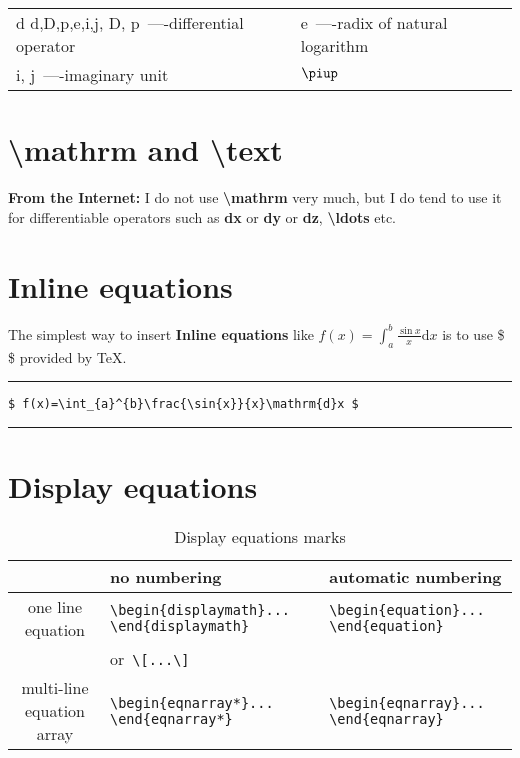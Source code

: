 \vspace{-0.5em}
\begin{flushleft}
\begin{tabularx}{0.7\textwidth}{XX}
$\mathrm{d}$ $\text{d,D,p,e,i,j}$, $\mathrm{D}$, $\mathrm{p}$~----differential operator & $\mathrm{e}$~----radix of natural logarithm\\
$\mathrm{i}$, $\mathrm{j}$~----imaginary unit & $\piup$\\
\end{tabularx}
\end{flushleft}

\section{\textbackslash mathrm and \textbackslash text}
\textbf{From the Internet:} I do not use \textbf{\textbackslash mathrm} very much, but I do tend to use it for differentiable operators such as \textbf{dx} or \textbf{dy} or \textbf{dz}, \textbf{\textbackslash ldots} etc.


\section{Inline equations}
The simplest way to insert \textbf{Inline equations} like $ f(x)=\int_{a}^{b}\frac{\sin{x}}{x}\mathrm{d}x $ is to use \$ \$ provided by \TeX{}.

\noindent\vspace{1em}\hrule
\begin{verbatim}
$ f(x)=\int_{a}^{b}\frac{\sin{x}}{x}\mathrm{d}x $
\end{verbatim}
\noindent\hrule\vspace{1em}

\section{Display equations}
\begin{table}[htbp]
\caption{Display equations marks}\label{tab:eqtag}
\vspace{0.5em}\centering
\begin{tabularx}{\textwidth}{cll}
\toprule
& no numbering & automatic numbering\\
\midrule
one line equation& \verb|\begin{displaymath}... \end{displaymath}|& \verb|\begin{equation}... \end{equation}|\\
        & or~\verb|\[...\]| & \\
multi-line equation array& \verb|\begin{eqnarray*}... \end{eqnarray*}|& \verb|\begin{eqnarray}... \end{eqnarray}|\\
\bottomrule
\end{tabularx}
\end{table}

